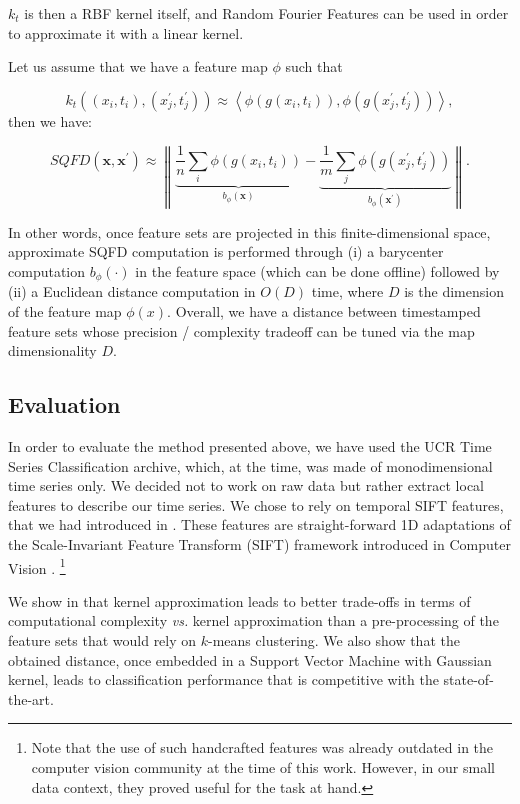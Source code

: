 $k_t$ is then a RBF kernel itself, and
Random Fourier Features \cite{NIPS2007_3182} can be
used in order to approximate it with a linear kernel.

Let us assume that we have a feature map $\phi$ such that

\begin{equation}
k_t((x_{i}, t_i), (x^\prime_j, t^\prime_j)) \approx
    \left\langle\phi(g(x_{i}, t_i)),
        \phi(g(x^\prime_{j}, t^\prime_j))\right\rangle,
\end{equation}
then we have:

\begin{equation}
SQFD(\mathbf{x}, \mathbf{x}^\prime) \approx \left\|
    \underbrace{\frac{1}{n}\sum_i \phi(g(x_{i}, t_i))}_{b_\phi(\mathbf{x})} -
    \underbrace{\frac{1}{m}\sum_j
        \phi(g(x^\prime_{j}, t^\prime_j))}_{b_\phi(\mathbf{x}^\prime)}
    \right\|.
\end{equation}

In other words, once feature sets are projected in this finite-dimensional
space, approximate SQFD computation is performed through (i) a barycenter
computation $b_\phi(\cdot)$ in the feature space (which can be done offline)
followed by (ii) a Euclidean distance computation in $O(D)$ time, where $D$ is
the dimension of the feature map $\phi(x)$.
Overall, we have a distance between timestamped feature sets whose
precision / complexity tradeoff can be tuned via the map dimensionality $D$.

\subsection{Evaluation}

In order to evaluate the method presented above, we have used the UCR Time
Series Classification archive, which, at the time, was made of monodimensional
time series only.
We decided not to work on raw data but rather extract local features to
describe our time series.
We chose to rely on temporal SIFT features, that we had introduced in
\cite{bailly:halshs-01184900,bailly:hal-01252726}.
These features are straight-forward 1D adaptations of the Scale-Invariant
Feature Transform (SIFT) framework introduced in Computer Vision
\cite{Lowe:2004:DIF:993451.996342}.%
\footnote{Note that the use of such handcrafted features was already outdated in the
computer vision community at the time of this work.
However, in our small data context, they proved useful for the task at hand.}

We show in \cite{tavenard:halshs-01561461} that kernel approximation
leads to better trade-offs in terms of computational
complexity \emph{vs.} kernel approximation than a pre-processing of the feature sets
that would rely on $k$-means clustering.
We also show that the obtained distance, once embedded in a Support Vector
Machine with Gaussian kernel, leads to classification performance that is
competitive with the state-of-the-art.
